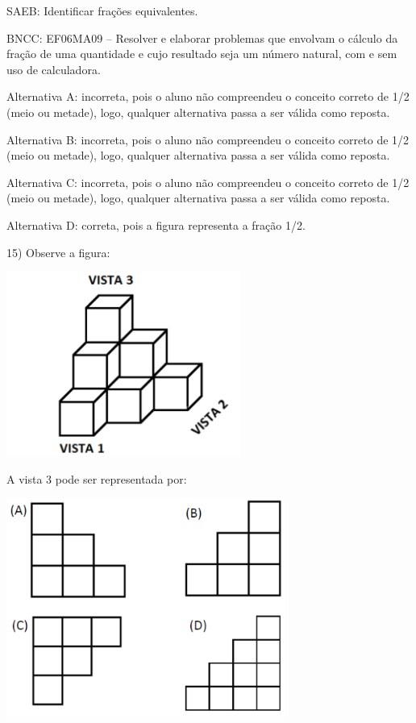 SAEB: Identificar frações equivalentes.

BNCC: EF06MA09 -- Resolver e elaborar problemas que envolvam o cálculo
da fração de uma quantidade e cujo resultado seja um número natural, com
e sem uso de calculadora.

Alternativa A: incorreta, pois o aluno não compreendeu o conceito
correto de 1/2 (meio ou metade), logo, qualquer alternativa passa a ser
válida como reposta.

Alternativa B: incorreta, pois o aluno não compreendeu o conceito
correto de 1/2 (meio ou metade), logo, qualquer alternativa passa a ser
válida como reposta.

Alternativa C: incorreta, pois o aluno não compreendeu o conceito
correto de 1/2 (meio ou metade), logo, qualquer alternativa passa a ser
válida como reposta.

Alternativa D: correta, pois a figura representa a fração 1/2.

15) Observe a figura:

\includegraphics[width=3.01693in,height=2.38354in]{./imgSAEB_6_MAT/media/image112.png}

A vista 3 pode ser representada por:

\includegraphics[width=3.59198in,height=2.82524in]{./imgSAEB_6_MAT/media/image113.png}

